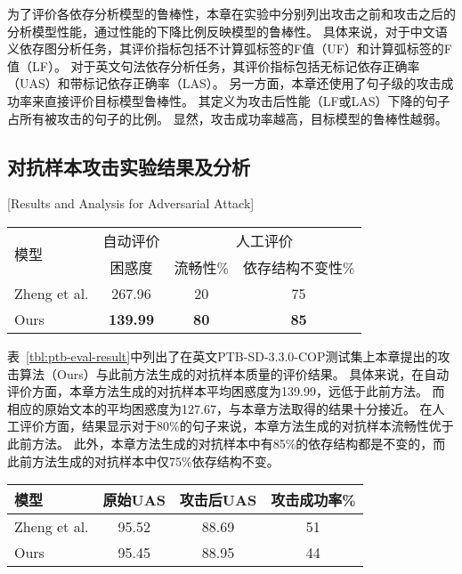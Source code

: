为了评价各依存分析模型的鲁棒性，本章在实验中分别列出攻击之前和攻击之后的分析模型性能，通过性能的下降比例反映模型的鲁棒性。
具体来说，对于中文语义依存图分析任务，其评价指标包括不计算弧标签的F值（UF）和计算弧标签的F值（LF）。
对于英文句法依存分析任务，其评价指标包括无标记依存正确率（UAS）和带标记依存正确率（LAS）。
另一方面，本章还使用了句子级的攻击成功率来直接评价目标模型鲁棒性。
其定义为攻击后性能（LF或LAS）下降的句子占所有被攻击的句子的比例。
显然，攻击成功率越高，目标模型的鲁棒性越弱。


\subsection{对抗样本攻击实验结果及分析}[Results and Analysis for Adversarial Attack]


\begin{table}[htbp]
    \vspace{0.5em}\centering\wuhao
	\begin{tabular}{lccc}
		\toprule[1.5pt]
		\multirow{2}{*}{模型}& 自动评价 & \multicolumn{2}{c}{人工评价} \\
		\cmidrule(r){2-2} \cmidrule(r){3-4}
		& 困惑度 &  流畅性\% & 依存结构不变性\%  \\
		\midrule[1pt]
		Zheng et al. & 267.96 & 20 & 75 \\
		Ours &\bf 139.99 &\bf 80 &\bf 85  \\
		\bottomrule[1.5pt]
	\end{tabular}
\end{table}

表~\ref{tbl:ptb-eval-result}中列出了在英文PTB-SD-3.3.0-COP测试集上本章提出的攻击算法（Ours）与此前方法生成的对抗样本质量的评价结果。
具体来说，在自动评价方面，本章方法生成的对抗样本平均困惑度为139.99，远低于此前方法。
而相应的原始文本的平均困惑度为127.67，与本章方法取得的结果十分接近。
在人工评价方面，结果显示对于80\%的句子来说，本章方法生成的对抗样本流畅性优于此前方法。
此外，本章方法生成的对抗样本中有85\%的依存结构都是不变的，而此前方法生成的对抗样本中仅75\%依存结构不变。

\begin{table}[htbp]
    \vspace{0.5em}\centering\wuhao
	\begin{tabular}{lccc}
		\toprule[1.5pt]
		模型& 原始UAS & 攻击后UAS & 攻击成功率\% \\
		\midrule[1pt]
		Zheng et al. & 95.52 & 88.69 & 51 \\
		Ours & 95.45 & 88.95 &  44 \\
		\bottomrule[1.5pt]
	\end{tabular}
\end{table}

